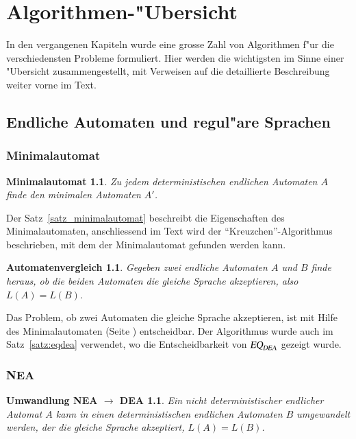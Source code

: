 \chapter{Algorithmen-"Ubersicht\label{skript:algorithmen}}
\rhead{}
In den vergangenen Kapiteln wurde eine grosse Zahl von Algorithmen
f"ur die verschiedensten Probleme formuliert. Hier werden die wichtigsten
im Sinne einer "Ubersicht zusammengestellt, mit Verweisen auf die 
detaillierte Beschreibung weiter vorne im Text.
\section{Endliche Automaten und regul"are Sprachen}
\subsection{Minimalautomat}
\newtheorem*{Minimalautomat}{Minimalautomat}
\begin{Minimalautomat}
Zu jedem deterministischen endlichen Automaten $A$ finde den minimalen
Automaten $A'$.
\end{Minimalautomat}
Der Satz~\ref{satz_minimalautomat} beschreibt die Eigenschaften des
Minimalautomaten, anschliessend im Text wird der ``Kreuzchen''-Algorithmus
beschrieben, mit dem der Minimalautomat gefunden werden kann.

\newtheorem*{Automatenvergleich}{Automatenvergleich}
\begin{Automatenvergleich}
Gegeben zwei endliche Automaten $A$ und $B$ finde heraus, ob die
beiden Automaten die gleiche Sprache akzeptieren, also $L(A)=L(B)$.
\end{Automatenvergleich}
Das Problem, ob zwei Automaten die gleiche Sprache akzeptieren,
ist mit Hilfe des Minimalautomaten (Seite \pageref{algorithmus:minimalautomat})
entscheidbar. 
Der Algorithmus wurde auch im Satz~\ref{satz:eqdea} verwendet, wo die
Entscheidbarkeit von $\textsl{EQ}_\textsl{DEA}$ gezeigt wurde.


\subsection{NEA}
\newtheorem*{NEA}{Umwandlung NEA $\to$ DEA}
\begin{NEA}
Ein nicht deterministischer endlicher Automat $A$ kann in einen 
deterministischen endlichen Automaten $B$ umgewandelt werden, der die
gleiche Sprache akzeptiert, $L(A)=L(B)$.
\end{NEA}

